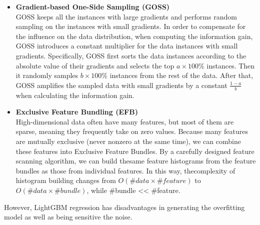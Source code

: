 \documentclass{ieeeojies}
\begin{document}
\begin{itemize}
    \item \textbf{Gradient-based One-Side Sampling (GOSS)}\\
    GOSS keeps all the instances with large gradients and performs random sampling on the instances with small gradients. In order to compensate for the influence on the data distribution, when computing the information gain, GOSS introduces a constant multiplier for the data instances with small gradients. Specifically, GOSS first sorts the data instances according to the absolute value of their gradients and selects the top \(a \times 100\%\) instances. Then it randomly samples \(b \times 100\%\) instances from the rest of the data. After that, GOSS amplifies the sampled data with small gradients by a constant \(\frac{1-a}{b}\) when calculating the information gain.\\
    \item \textbf{Exclusive Feature Bundling (EFB)}\\
    High-dimensional data often have many features, but most of them are sparse, meaning they frequently take on zero values. Because many features are mutually exclusive (never nonzero at the same time), we can combine these features into Exclusive Feature Bundles. By a carefully designed feature scanning algorithm, we can build thesame feature histograms from the feature bundles as those from individual features. In this way, thecomplexity of histogram building changes from \(O(\#data \times \#feature)\) to \(O(\#data \times \#bundle)\), while \#bundle << \#feature. %
\end{itemize}
However,  LightGBM  regression  has  disadvantages in generating the overfitting model as well as being sensitive the noise.
\end{document}
